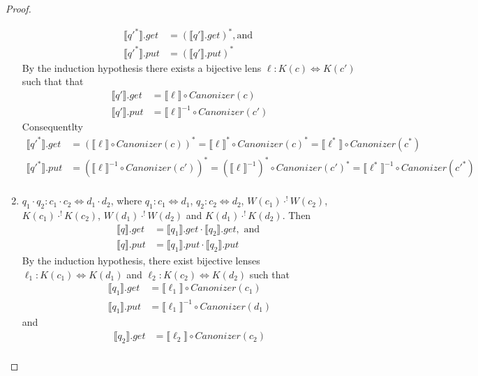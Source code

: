 \documentclass{svproc}
\begin{document}
\begin{proof}
\begin{enumerate}
\begin{align*}
  \llbracket {q'}^* \rrbracket.get &= (\llbracket q' \rrbracket.get)^*, \text{
  and }\\
  \llbracket {q'}^* \rrbracket.put &= (\llbracket q' \rrbracket.put)^*
  \end{align*}
  By the induction hypothesis there exists a bijective lens $\ell : K(c)
  \Leftrightarrow K(c')$ such that 
   that
  \begin{align*}
\llbracket q' \rrbracket.get &= \llbracket \ell \rrbracket \circ
Canonizer(c)\\
\llbracket q' \rrbracket.put &= {\llbracket \ell \rrbracket}^{-1} \circ
Canonizer(c')
\end{align*}
Consequentlty
\begin{align*}
\llbracket {q'}^* \rrbracket.get &= (\llbracket \ell \rrbracket \circ
Canonizer(c))^* = \llbracket \ell \rrbracket^* \circ
Canonizer(c)^* = \llbracket \ell^* \rrbracket \circ
Canonizer(c^*)\\
\llbracket {q'}^* \rrbracket.put &= (\llbracket \ell \rrbracket^{-1} \circ
Canonizer(c'))^* = (\llbracket \ell \rrbracket^{-1})^* \circ
Canonizer(c')^* = \llbracket \ell^* \rrbracket^{-1} \circ
Canonizer(c'^*)\\
\end{align*}
\item
  $q_1 \cdot q_2: c_1 \cdot c_2 \Leftrightarrow d_1 \cdot d_2$, where $q_1 : c_1
  \Leftrightarrow d_1 $,  $q_2 : c_2 \Leftrightarrow d_2$, $W(c_1)
  \cdot^! W(c_2)$, $K(c_1) \cdot^! K(c_2)$, $W(d_1) \cdot^! W(d_2)$ and $
  K(d_1) \cdot^! K(d_2)$. Then
  \begin{align*}
  \llbracket q \rrbracket.get &= \llbracket q_1 \rrbracket.get \cdot \llbracket
  q_2 \rrbracket.get, \text{ and }\\
  \llbracket q \rrbracket.put &= \llbracket q_1 \rrbracket.put \cdot \llbracket
  q_2 \rrbracket.put
  \end{align*}
By the induction hypothesis, there exist bijective lenses $\ell_1 : K(c_1)
\Leftrightarrow K(d_1)$ and $\ell_2 : K(c_2) \Leftrightarrow K(d_2)$ such that
\begin{align*}
\llbracket q_1 \rrbracket.get &= \llbracket \ell_1 \rrbracket \circ
Canonizer(c_1)\\
\llbracket q_1 \rrbracket.put &= {\llbracket \ell_1 \rrbracket}^{-1} \circ
Canonizer(d_1)
\end{align*}
and
\begin{align*}
\llbracket q_2 \rrbracket.get &= \llbracket \ell_2 \rrbracket \circ
Canonizer(c_2)\\

\end{align*}
\end{enumerate}
\end{proof}
\end{document}
